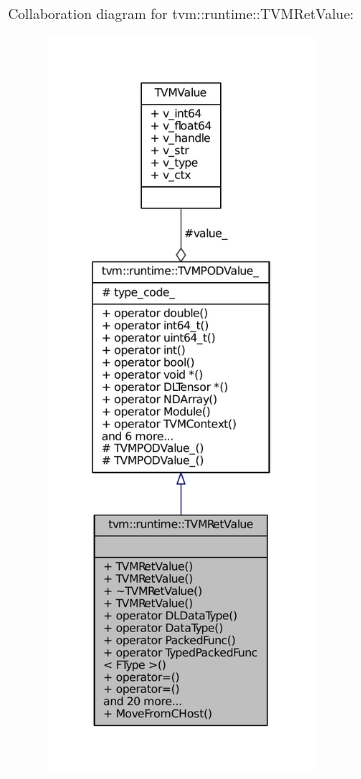 Collaboration diagram for tvm\+:\+:runtime\+:\+:T\+V\+M\+Ret\+Value\+:
\nopagebreak
\begin{figure}[H]
\begin{center}
\leavevmode
\includegraphics[height=550pt]{classtvm_1_1runtime_1_1TVMRetValue__coll__graph}
\end{center}
\end{figure}
